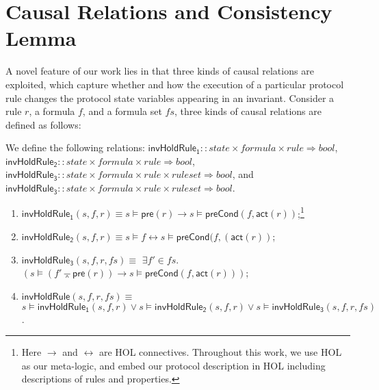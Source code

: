 \documentclass[conference]{IEEEtran}
\newlength{\fminilength}
\newenvironment{fmini}[1][\linewidth]
  {\setlength{\fminilength}{#1\fboxsep-2\fboxrule}%
   \vspace{2ex}\noindent\begin{lrbox}{\fminibox}\begin{minipage}{\fminilength}%
   \mbox{ }\hfill\vspace{-2.5ex}}%
  {\end{minipage}\end{lrbox}\vspace{1ex}\hspace{0ex}%
   \framebox{\usebox{\fminibox}}}
\newenvironment{specification}
{\noindent\scriptsize
\tt\begin{fmini}\begin{tabbing}X\=X12345\=XXXX\=XXXX\=XXXX\=XXXX\=XXXX
\=\+\kill} {\end{tabbing}\normalfont\end{fmini}}
\def \andc {\barwedge }
\begin{document}
\section{Causal Relations and Consistency Lemma} \label{sec:causal_rel}
A novel feature of our work lies in that three kinds of causal
relations are exploited, which capture whether and how the execution of a particular protocol rule changes the protocol state variables appearing in an invariant.  Consider a rule $r$, a formula $f$, and a formula set $fs$, three
 kinds of causal relations are defined as follows:
 \begin{definition}
We define the following relations: $\mathsf{invHoldRule_1}::state \times formula\times rule \Rightarrow bool$, $\mathsf{invHoldRule_2}::state\times  formula\times rule  \Rightarrow bool$,  $\mathsf{invHoldRule_3}::state \times formula\times rule \times rule set\Rightarrow bool$, and $\mathsf{invHoldRule_3}::state \times formula\times rule \times rule set\Rightarrow bool$.
\vspace{-0.2cm}
\begin{enumerate}
\item $\mathsf{invHoldRule_1} (s,f,r) \equiv $$s \models \mathsf{pre}(r) \longrightarrow s \models \mathsf{preCond}(f ,\mathsf{act}(r))$;\footnote{Here  $\longrightarrow$ and $\longleftrightarrow$ are HOL connectives.  Throughout this work, we use HOL as our meta-logic, and embed our protocol description in HOL including descriptions of rules and properties.}
\item $\mathsf{invHoldRule_2}(s,f,r) \equiv  $$s \models f \longleftrightarrow s \models \mathsf{preCond}( f,(\mathsf{act}( r))$;
\item $\mathsf{invHoldRule_3}(s,f,r,fs) \equiv$  $\exists f' \in fs$.
$(s \models ( f' \andc \mathsf{pre}(r))  \longrightarrow s \models \mathsf{preCond}(f ,\mathsf{act}(r)))$;
\item $\mathsf{invHoldRule}(s,f,r, fs) \equiv$   $s \models\mathsf{invHoldRule_1}(s,f,r) \vee s\models\mathsf{invHoldRule_2}(s,f,r) \vee s\models \mathsf{invHoldRule_3}(s,f,r,fs)$.
\end{enumerate}
\end{definition}
\vspace{-0.2cm}
\end{document}
